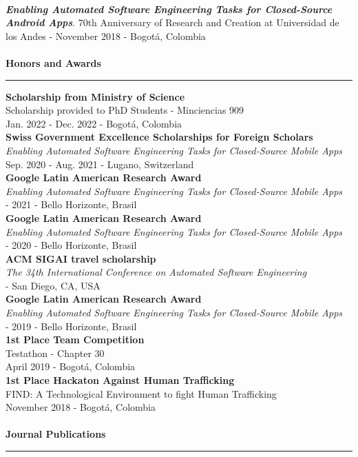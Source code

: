 \documentclass[letterpaper,11pt,oneside]{article}
\begin{document}
\\
\indent \textit{\textbf{Enabling Automated Software Engineering Tasks for Closed-Source Android Apps}}. 70th Anniversary of Research and Creation at Universidad de los Andes - November 2018 - Bogot\'a, Colombia
\\ \\
\noindent \Large{\textbf{Honors and Awards}} \\
\vspace{-2ex}
\hrule 
\normalsize
\vspace{2ex}
\noindent \indent \textbf{Scholarship from Ministry of Science } \\
\indent Scholarship provided to PhD Students - Minciencias 909\\
\indent Jan. 2022 - Dec. 2022 - Bogot\'a, Colombia \\
\noindent \indent \textbf{Swiss Government Excellence Scholarships for Foreign Scholars} \\
\indent \textit{Enabling Automated Software Engineering Tasks for Closed-Source Mobile Apps}\\
\indent Sep. 2020 - Aug. 2021 - Lugano, Switzerland \\
\noindent \indent \textbf{Google Latin American Research Award} \\
\indent \textit{Enabling Automated Software Engineering Tasks for Closed-Source Mobile Apps}\\
 - 2021 - Bello Horizonte, Brasil \\
\noindent \indent \textbf{Google Latin American Research Award} \\
\indent \textit{Enabling Automated Software Engineering Tasks for Closed-Source Mobile Apps}\\
 - 2020 - Bello Horizonte, Brasil \\
\noindent \indent \textbf{ACM SIGAI travel scholarship} \\
\indent \textit{The 34th International Conference on Automated Software Engineering }\\
 - San Diego, CA, USA \\
\noindent \indent \textbf{Google Latin American Research Award} \\
\indent \textit{Enabling Automated Software Engineering Tasks for Closed-Source Mobile Apps}\\
 - 2019 - Bello Horizonte, Brasil \\
\noindent \indent \textbf{1st Place Team Competition} \\
\indent Testathon - Chapter 30\\
\indent April 2019 - Bogotá, Colombia \\
\noindent \indent \textbf{1st Place Hackaton Against Human Trafficking} \\
\indent FIND: A Technological Environment to fight Human Trafficking\\
\indent November 2018 - Bogotá, Colombia \\
\\
\noindent \Large{\textbf{Journal Publications}} \\
\vspace{-2ex}
\hrule 
\normalsize
\vspace{0.5cm}
\end{document}
